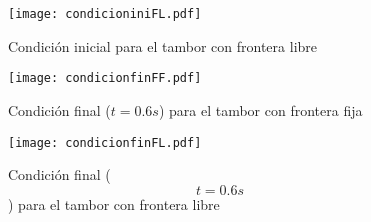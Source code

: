 \documentclass[11pt,letterpaper]{exam}
\begin{document}
\begin{figure}[H]
\begin{center}
\texttt{[image: condicioniniFL.pdf]} 
\caption{\label{fig:typical}Condici\'on inicial para el tambor con frontera libre}
\end{center}
\end{figure}


\begin{figure}[H]
\begin{center}
\texttt{[image: condicionfinFF.pdf]} 
\caption{\label{fig:typical}Condici\'on final ($t=0.6 s$) para el tambor con frontera fija}
\end{center}
\end{figure}


\begin{figure}[H]
\begin{center}
\texttt{[image: condicionfinFL.pdf]} 
\caption{\label{fig:typical}Condici\'on final ($$t=0.6 s$$) para el tambor con frontera libre}
\end{center}
\end{figure}
\end{document}
